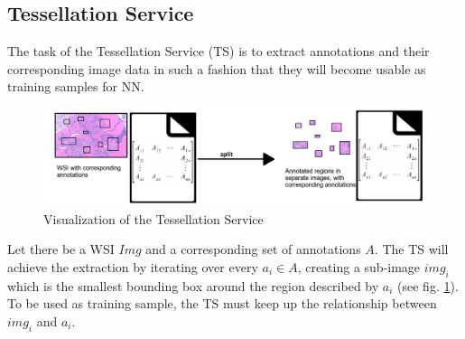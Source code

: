 \subsection{Tessellation Service}
\label{sec2_ts}
The task of the Tessellation Service (TS) is to extract annotations and their corresponding image data in such a fashion that they will become usable as training samples for NN.

\begin{figure}[H]
	\begin{center}
		\includegraphics[scale=0.25]{img/processChainC.png}
		\caption{Visualization of the Tessellation Service}
		\label{fig2_processChainC}
	\end{center}
\end{figure}

Let there be a WSI $Img$ and a corresponding set of annotations $A$. The TS will achieve the extraction by iterating over every $a_i \in A$, creating a sub-image $img_i$ which is the smallest bounding box around the region described by $a_i$ (see fig. \ref{fig2_processChainC}). To be used as training sample, the TS must keep up the relationship between $img_i$ and $a_i$.